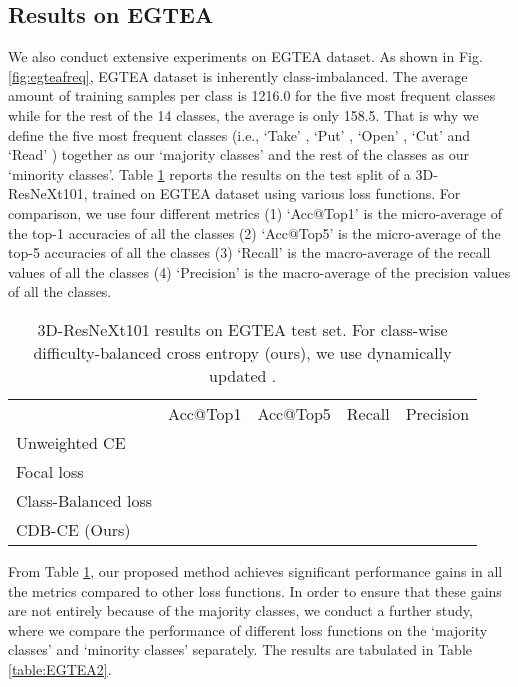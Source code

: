 \documentclass[runningheads]{llncs}
\begin{document}
\subsection{Results on EGTEA}
We also conduct extensive experiments on EGTEA \cite{EGTEA} dataset. As shown in 
Fig. \ref{fig:egteafreq}, EGTEA dataset is inherently class-imbalanced. The average amount of training
samples per class is 1216.0 for the five most frequent classes while for the 
rest of the 14 classes, the average is only 158.5. That is why we define the 
five most frequent classes (i.e., ‘Take’ , ‘Put’ , ‘Open’ , ‘Cut’ and ‘Read’ ) 
together as our ‘majority classes’ and the rest of the classes as our ‘minority 
classes’. Table \ref{table:EGTEA1} reports the results on the
test split of a 3D-ResNeXt101, trained on EGTEA dataset using various loss 
functions. For comparison, we use four different metrics (1) ‘Acc@Top1’ is the 
micro-average of the top-1 accuracies of all the classes (2) ‘Acc@Top5’ is the 
micro-average of the top-5 accuracies of all the classes (3) ‘Recall’ is the 
macro-average of the recall values of all the classes (4) ‘Precision’ is the 
macro-average of the precision values of all the classes.

\setlength{\tabcolsep}{4pt}
\begin{table}[t]
\begin{center}
\caption{
3D-ResNeXt101 results on EGTEA test set. For class-wise difficulty-balanced cross
entropy (ours), we use dynamically updated .
}
\label{table:EGTEA1}
\begin{tabular}{lllll}
\hline\noalign{\smallskip}
 & Acc@Top1 & Acc@Top5  & Recall & Precision \\
\noalign{\smallskip}
\hline
\noalign{\smallskip}
Unweighted CE & &  &  & \\
Focal loss \cite{FOCALloss} & &  &  & \\
Class-Balanced loss \cite{Class_balancedloss}& &  &  & \\
CDB-CE (Ours)& &  &  & \\
\hline
\end{tabular}
\end{center}
\end{table}
\setlength{\tabcolsep}{1.4pt}


From Table \ref{table:EGTEA1}, our proposed method achieves significant performance gains in
all the metrics compared to other loss functions. In order to ensure that these 
gains are not entirely because of the majority classes, we conduct a further 
study, where we compare the performance of different loss functions on the 
‘majority classes’ and ‘minority classes’ separately. The results are tabulated 
in Table \ref{table:EGTEA2}.
\end{document}
